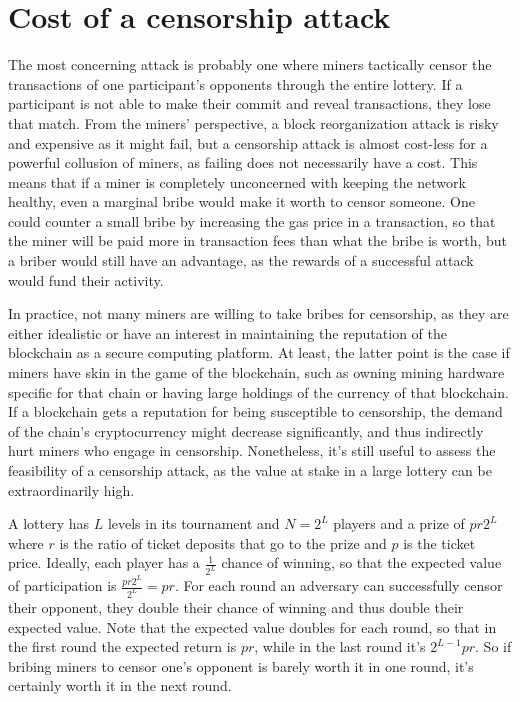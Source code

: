 \section{Cost of a censorship attack}
\label{sec:censorship}
The most concerning attack is probably one where miners tactically censor the transactions of one participant's opponents through the entire lottery. If a participant is not able to make their commit and reveal transactions, they lose that match. From the miners' perspective, a block reorganization attack is risky and expensive as it might fail, but a censorship attack is almost cost-less for a powerful collusion of miners, as failing does not necessarily have a cost. This means that if a miner is completely unconcerned with keeping the network healthy, even a marginal bribe would make it worth to censor someone. One could counter a small bribe by increasing the gas price in a transaction, so that the miner will be paid more in transaction fees than what the bribe is worth, but a briber would still have an advantage, as the rewards of a successful attack would fund their activity. 

In practice, not many miners are willing to take bribes for censorship, as they are either idealistic or have an interest in maintaining the reputation of the blockchain as a secure computing platform. At least, the latter point is the case if miners have skin in the game of the blockchain, such as owning mining hardware specific for that chain or having large holdings of the currency of that blockchain. If a blockchain gets a reputation for being susceptible to censorship, the demand of the chain's cryptocurrency might decrease significantly, and thus indirectly hurt miners who engage in censorship. Nonetheless, it's still useful to assess the feasibility of a censorship attack, as the value at stake in a large lottery can be extraordinarily high.

A lottery has $L$ levels in its tournament and $N=2^L$ players and a prize of $p r 2^L$ where $r$ is the ratio of ticket deposits that go to the prize and $p$ is the ticket price. Ideally, each player has a $\frac{1}{2^L}$ chance of winning, so that the expected value of participation is $\frac{p r 2^L}{2^L}=pr$. For each round an adversary can successfully censor their opponent, they double their chance of winning and thus double their expected value. Note that the expected value doubles for each round, so that in the first round the expected return is $pr$, while in the last round it's $2^{L-1}pr$. So if bribing miners to censor one's opponent is barely worth it in one round, it's certainly worth it in the next round.

